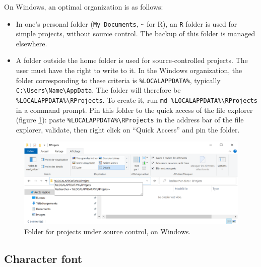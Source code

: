 \documentclass[
  12pt,
  american,
  a4paper,
  extrafontsizes,onecolumn,openright
  ]{memoir}
\providecommand{\tightlist}{%
  \setlength{\itemsep}{0pt}\setlength{\parskip}{0pt}}
\begin{document}
On Windows, an optimal organization is as follows:

\begin{itemize}
\tightlist
\item
  In one's personal folder (\texttt{My\ Documents}, \texttt{\textasciitilde{}} for R), an \texttt{R} folder is used for simple projects, without source control.
  The backup of this folder is managed elsewhere.
\item
  A folder outside the home folder is used for source-controlled projects.
  The user must have the right to write to it.
  In the Windows organization, the folder corresponding to these criteria is \texttt{\%LOCALAPPDATA\%}, typically \texttt{C:\textbackslash{}Users\textbackslash{}Name\textbackslash{}AppData}.
  The folder will therefore be \texttt{\%LOCALAPPDATA\%\textbackslash{}RProjects}.
  To create it, run \texttt{md\ \%LOCALAPPDATA\%\textbackslash{}RProjects} in a command prompt.
  Pin this folder to the quick access of the file explorer (figure \ref{fig:R-ProjetsR}): paste \texttt{\%LOCALAPPDATA\%\textbackslash{}RProjects} in the address bar of the file explorer, validate, then right click on \enquote{Quick Access} and pin the folder.
\end{itemize}



\scriptsize

\begin{figure}

{\centering \includegraphics[width=1\linewidth]{images/R-ProjetsR} 

}

\caption{Folder for projects under source control, on Windows.}\label{fig:R-ProjetsR}
\end{figure}

\normalsize

\subsection{Character font}\label{character-font}
\end{document}
